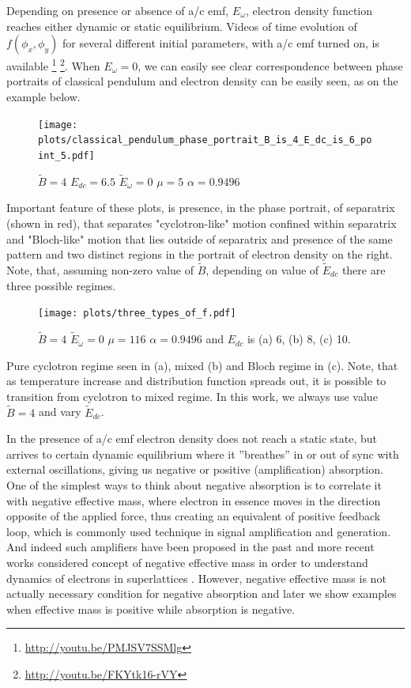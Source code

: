 \documentclass[40pt,letterpaper,physrev]{article}
\begin{document}
    Depending on presence or absence
    of a/c emf, $E_\omega$, electron density function reaches either dynamic or static equilibrium. Videos of 
    time evolution of $f(\phi_x,\phi_y)$ for several different initial parameters, with a/c emf turned on, is
    available \footnote{\url{http://youtu.be/PMJSV7SSMlg}} \footnote{\url{http://youtu.be/FKYtk16-rVY}}. When 
    $E_{\omega}=0$, we can easily see clear correspondence between phase portraits of classical pendulum and
    electron density can be easily seen, as on the example below.
    \begin{figure}[H]
   	  \centering
	  \normalsize %
	  \texttt{[image: plots/classical\_pendulum\_phase\_portrait\_B\_is\_4\_E\_dc\_is\_6\_point\_5.pdf]}
	  \label{fig:classical_and_boltzmann_correspondence_map}
	  \caption{$\tilde{B}=4$ $E_{dc}=6.5$ $\tilde{E}_{\omega}=0$ $\mu=5$ $\alpha=0.9496$}
	\end{figure}
	Important feature of these plots, is presence, in the phase portrait, of separatrix (shown in red), that separates
	"cyclotron-like" motion confined within separatrix and "Bloch-like" motion that lies outside of separatrix and 
	presence of the same pattern and two distinct regions in the portrait of electron density on the right. Note, that,
	assuming non-zero value of $\tilde{B}$, depending on value of $\tilde{E}_{dc}$ there are three possible regimes.
    \begin{figure}[H]
   	  \centering
	  \normalsize %
	  \texttt{[image: plots/three\_types\_of\_f.pdf]}
	  \label{fig:three_regimes}
	  \caption{$\tilde{B}=4$ $\tilde{E}_{\omega}=0$ $\mu=116$ $\alpha=0.9496$ 
	  and $E_{dc}$ is (a) 6, (b) 8, (c) 10. }
	\end{figure}
	Pure cyclotron regime seen in (a), mixed (b) and Bloch regime in (c). Note, that as temperature increase and
	distribution function spreads out, it is possible to transition from cyclotron to mixed regime. In this work, we
    always use value $\tilde{B} = 4$ and vary $\tilde{E}_{dc}$. 
    
    In the presence of a/c emf electron density does not reach a static state, but arrives to certain dynamic 
    equilibrium where it ”breathes” in or out of sync with external oscillations, giving us negative or positive
    (amplification) absorption. One of the simplest ways to think about negative absorption is to correlate it with
    negative effective mass, where electron in essence moves in the direction opposite of the applied force, thus 
    creating an equivalent of positive feedback loop, which is commonly used technique in signal amplification and
    generation. And indeed such amplifiers have been proposed in the past \cite{PhysRev.109.1856} and more recent 
    works considered concept of negative effective mass in order to understand dynamics of electrons in superlattices
    \cite{Gribnikov2002276}. However, negative effective mass is not actually necessary condition for negative absorption
    and later we show examples when effective mass is positive while absorption is negative.
    
\end{document}
